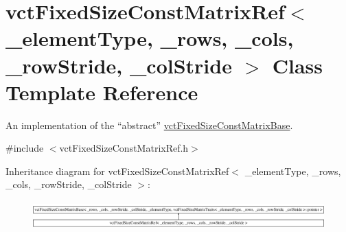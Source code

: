 \hypertarget{classvct_fixed_size_const_matrix_ref}{\section{vct\-Fixed\-Size\-Const\-Matrix\-Ref$<$ \-\_\-element\-Type, \-\_\-rows, \-\_\-cols, \-\_\-row\-Stride, \-\_\-col\-Stride $>$ Class Template Reference}
\label{classvct_fixed_size_const_matrix_ref}
}


An implementation of the ``abstract'' \hyperlink{classvct_fixed_size_const_matrix_base}{vct\-Fixed\-Size\-Const\-Matrix\-Base}.  




{\ttfamily \#include $<$vct\-Fixed\-Size\-Const\-Matrix\-Ref.\-h$>$}

Inheritance diagram for vct\-Fixed\-Size\-Const\-Matrix\-Ref$<$ \-\_\-element\-Type, \-\_\-rows, \-\_\-cols, \-\_\-row\-Stride, \-\_\-col\-Stride $>$\-:\begin{figure}[H]
\begin{center}
\leavevmode
\includegraphics[height=1.099117cm]{d5/d4c/classvct_fixed_size_const_matrix_ref}
\end{center}
\end{figure}

